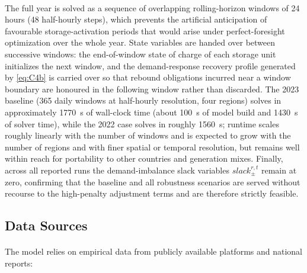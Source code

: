 \documentclass[12pt]{article}
\begin{document}
\paragraph{}
The full year is solved as a sequence of overlapping rolling-horizon windows of 24 hours (48 half-hourly steps), which prevents the artificial anticipation of favourable storage-activation periods that would arise under perfect-foresight optimization over the whole year. State variables are handed over between successive windows: the end-of-window state of charge of each storage unit initializes the next window, and the demand-response recovery profile generated by \eqref{eq:C4b} is carried over so that rebound obligations incurred near a window boundary are honoured in the following window rather than discarded. The 2023 baseline (365 daily windows at half-hourly resolution, four regions) solves in approximately \SI{1770}{s} of wall-clock time (about \SI{100}{s} of model build and \SI{1430}{s} of solver time), while the 2022 case solves in roughly \SI{1560}{s}; runtime scales roughly linearly with the number of windows and is expected to grow with the number of regions and with finer spatial or temporal resolution, but remains well within reach for portability to other countries and generation mixes. Finally, across all reported runs the demand-imbalance slack variables $slack^{r,t}_{\pm}$ remain at zero, confirming that the baseline and all robustness scenarios are served without recourse to the high-penalty adjustment terms and are therefore strictly feasible.

\subsection{Data Sources}
\label{subsec:data}

\paragraph{}
The model relies on empirical data from publicly available platforms and national reports:
\end{document}
